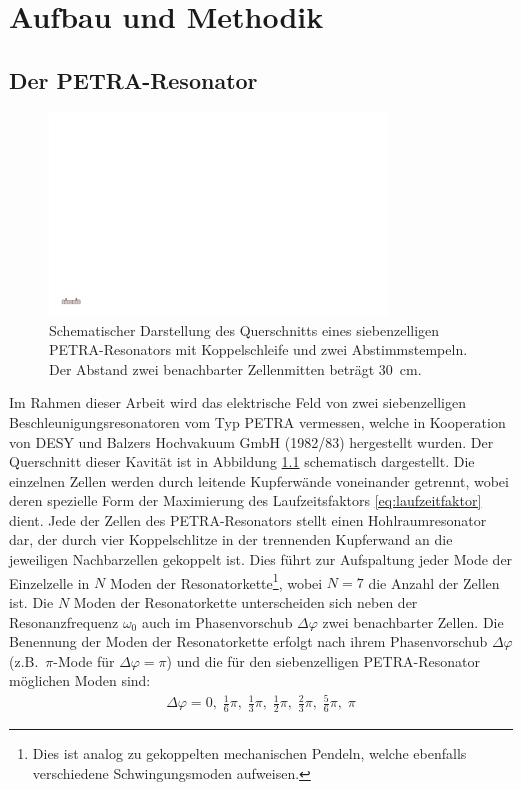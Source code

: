 \chapter{Aufbau und Methodik}
\label{sec:aufbau_und_methodik}


\section{Der PETRA-Resonator}
\begin{figure}[htb]
  \centering
  \includegraphics[width=0.8\textwidth]{./figs/cavity/cavity.pdf}
  \caption{Schematischer Darstellung des Querschnitts eines siebenzelligen PETRA-Resonators mit Koppelschleife und zwei Abstimmstempeln. Der Abstand zwei benachbarter Zellenmitten beträgt \SI{30}{\centi\metre}.}
  \label{fig:petra_cavity}
\end{figure}
Im Rahmen dieser Arbeit wird das elektrische Feld von zwei siebenzelligen Beschleunigungsresonatoren vom Typ PETRA \cite{desy_petra} vermessen, welche in Kooperation von DESY und Balzers Hochvakuum GmbH (1982/83) hergestellt wurden.
Der Querschnitt dieser Kavität ist in Abbildung \ref{fig:petra_cavity} schematisch dargestellt.
Die einzelnen Zellen werden durch leitende Kupferwände voneinander getrennt, wobei deren spezielle Form der Maximierung des Laufzeitsfaktors \eqref{eq:laufzeitfaktor} dient.
Jede der Zellen des PETRA-Resonators stellt einen Hohlraumresonator dar, der durch vier Koppelschlitze in der trennenden Kupferwand an die jeweiligen Nachbarzellen gekoppelt ist.
Dies führt zur Aufspaltung jeder Mode der Einzelzelle in $N$ Moden der Resonatorkette\footnote{Dies ist analog zu gekoppelten mechanischen Pendeln, welche ebenfalls verschiedene Schwingungsmoden aufweisen.}, wobei $N = 7$ die Anzahl der Zellen ist.
Die $N$ Moden der Resonatorkette unterscheiden sich neben der Resonanzfrequenz $\omega_0$ auch im Phasenvorschub $\Delta \varphi$ zwei benachbarter Zellen.
Die Benennung der Moden der Resonatorkette erfolgt nach ihrem Phasenvorschub $\Delta \varphi$ (z.B.\ $\pi$-Mode für $\Delta \varphi = \pi$) und die für den siebenzelligen PETRA-Resonator möglichen Moden sind:
\begin{align}
  \Delta \varphi = 0,\; \frac{1}{6} \pi,\; \frac{1}{3} \pi,\; \frac{1}{2} \pi,\; \frac{2}{3} \pi,\; \frac{5}{6} \pi,\; \pi
\end{align}

